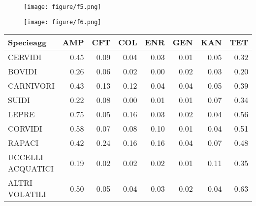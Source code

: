 \documentclass{article}
\begin{document}
\begin{figure}[]
\texttt{[image: figure/f5.png]} \caption{}\label{fig:unnamed-chunk-1}
\end{figure}

\begin{figure}[]
\texttt{[image: figure/f6.png]} \caption{}\label{fig:unnamed-chunk-1}
\end{figure}

\begin{table}[h]
\centering
\begin{tabular}{l|r|r|r|r|r|r|r}
\hline
Specieagg & AMP & CFT & COL & ENR & GEN & KAN & TET\\
\hline
CERVIDI & 0.45 & 0.09 & 0.04 & 0.03 & 0.01 & 0.05 & 0.32\\
\hline
BOVIDI & 0.26 & 0.06 & 0.02 & 0.00 & 0.02 & 0.03 & 0.20\\
\hline
CARNIVORI & 0.43 & 0.13 & 0.12 & 0.04 & 0.04 & 0.05 & 0.39\\
\hline
SUIDI & 0.22 & 0.08 & 0.00 & 0.01 & 0.01 & 0.07 & 0.34\\
\hline
LEPRE & 0.75 & 0.05 & 0.16 & 0.03 & 0.02 & 0.04 & 0.56\\
\hline
CORVIDI & 0.58 & 0.07 & 0.08 & 0.10 & 0.01 & 0.04 & 0.51\\
\hline
RAPACI & 0.42 & 0.24 & 0.16 & 0.16 & 0.04 & 0.07 & 0.48\\
\hline
UCCELLI ACQUATICI & 0.19 & 0.02 & 0.02 & 0.02 & 0.01 & 0.11 & 0.35\\
\hline
ALTRI VOLATILI & 0.50 & 0.05 & 0.04 & 0.03 & 0.02 & 0.04 & 0.63\\
\hline
\end{tabular}
\end{table}
\end{document}
